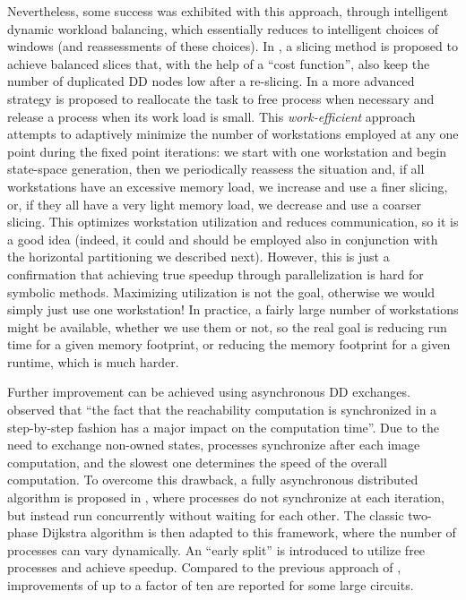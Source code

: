 \documentclass[copyright,creativecommons]{eptcs}
\begin{document}
Nevertheless, some success was exhibited with this approach,
through intelligent dynamic workload balancing, which essentially reduces
to intelligent choices of windows (and reassessments of these choices).
In \cite{Heymann2002fmsd}, a slicing method is proposed to achieve balanced
slices that, with the help of a ``cost function'', also keep the number
of duplicated DD nodes low after a re-slicing.
In \cite{Grumberg2003workefficient} a more advanced strategy is
proposed to reallocate the task to free process when necessary and
release a process when its work load is small. This
\emph{work-efficient} approach attempts to adaptively minimize the
number of workstations employed at any one point during the fixed
point iterations: we start with one workstation and begin
state-space generation, then we periodically reassess the situation
and, if all workstations have an excessive memory load, we increase
 and use a finer slicing, or, if they all have a very light
memory load, we decrease  and use a coarser slicing. This
optimizes workstation utilization and reduces communication, so it
is a good idea (indeed, it could and should be employed also in
conjunction with the horizontal partitioning we described next).
However, this is just a confirmation that achieving true speedup
through parallelization is hard for symbolic methods.
Maximizing utilization is not the
goal, otherwise we would simply just use one workstation! In
practice, a fairly large number of workstations might be available,
whether we use them or not, so the real goal is reducing run time
for a given memory footprint, or reducing the memory footprint for a
given runtime, which is much harder.

Further improvement can be achieved using  asynchronous DD exchanges.
\cite{Grumberg2003workefficient} observed that ``the fact that the reachability
computation is synchronized in a step-by-step fashion
has a major impact on the computation time''.
Due to the need to exchange non-owned states, processes synchronize
after each image computation, and the slowest one determines the speed
of the overall computation.
To overcome this drawback, a fully asynchronous distributed algorithm is
proposed in \cite{Grumberg2005AsynPDSSGEN}, where
processes do not synchronize at each iteration, but instead run
concurrently without waiting for each other.
The classic two-phase Dijkstra algorithm is then adapted to
this framework, where the number of processes can vary dynamically.
An ``early split'' is introduced to utilize free processes and achieve speedup.
Compared to the previous approach of \cite{Grumberg2003workefficient},
improvements of up to a factor of ten are reported for some large circuits.
\end{document}

